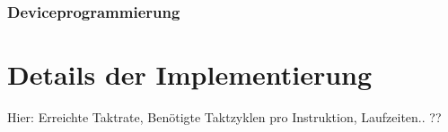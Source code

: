 \subsubsection{Deviceprogrammierung}


\section{Details der Implementierung}
Hier: Erreichte Taktrate, Benötigte Taktzyklen pro
Instruktion, Laufzeiten.. ??
